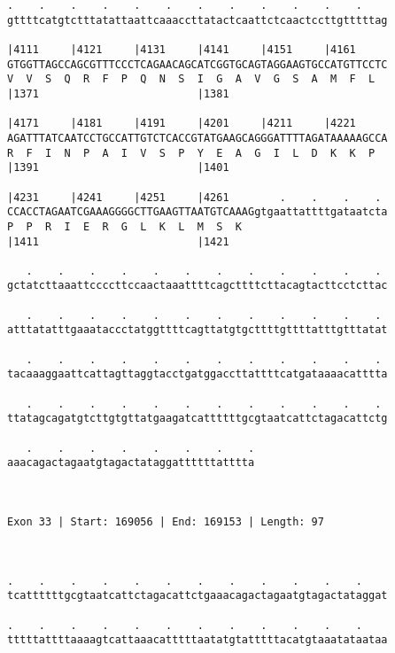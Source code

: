 \documentclass{article}
\begin{document}
\begin{Verbatim}
.    .    .    .    .    .    .    .    .    .    .    .    
gttttcatgtctttatattaattcaaaccttatactcaattctcaactccttgtttttag
                                                            
|4111     |4121     |4131     |4141     |4151     |4161     
GTGGTTAGCCAGCGTTTCCCTCAGAACAGCATCGGTGCAGTAGGAAGTGCCATGTTCCTC
V  V  S  Q  R  F  P  Q  N  S  I  G  A  V  G  S  A  M  F  L  
|1371                         |1381                         
  
|4171     |4181     |4191     |4201     |4211     |4221     
AGATTTATCAATCCTGCCATTGTCTCACCGTATGAAGCAGGGATTTTAGATAAAAAGCCA
R  F  I  N  P  A  I  V  S  P  Y  E  A  G  I  L  D  K  K  P  
|1391                         |1401                         
  
|4231     |4241     |4251     |4261        .    .    .    . 
CCACCTAGAATCGAAAGGGGCTTGAAGTTAATGTCAAAGgtgaattattttgataatcta
P  P  R  I  E  R  G  L  K  L  M  S  K                       
|1411                         |1421                         
  
   .    .    .    .    .    .    .    .    .    .    .    . 
gctatcttaaattccccttccaactaaattttcagcttttcttacagtacttcctcttac
                                                            
   .    .    .    .    .    .    .    .    .    .    .    . 
atttatatttgaaataccctatggttttcagttatgtgcttttgttttatttgtttatat
                                                            
   .    .    .    .    .    .    .    .    .    .    .    . 
tacaaaggaattcattagttaggtacctgatggaccttattttcatgataaaacatttta
                                                            
   .    .    .    .    .    .    .    .    .    .    .    . 
ttatagcagatgtcttgtgttatgaagatcattttttgcgtaatcattctagacattctg
                                                            
   .    .    .    .    .    .    .    .
aaacagactagaatgtagactataggattttttatttta
                                       
                                       
 
Exon 33 | Start: 169056 | End: 169153 | Length: 97



.    .    .    .    .    .    .    .    .    .    .    .    
tcattttttgcgtaatcattctagacattctgaaacagactagaatgtagactataggat
                                                            
.    .    .    .    .    .    .    .    .    .    .    .    
tttttattttaaaagtcattaaacatttttaatatgtatttttacatgtaaatataataa
                                                            

\end{Verbatim}
\end{document}
